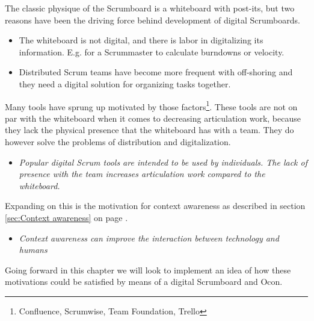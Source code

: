 \documentclass[../report.tex]{subfiles}
\begin{document}
The classic physique of the Scrumboard is a whiteboard with post-its, but two reasons have been the driving force behind development of digital Scrumboards.

\begin{itemize}
\item The whiteboard is not digital, and there is labor in digitalizing its information. E.g. for a Scrummaster to calculate burndowns or velocity.
\item Distributed Scrum teams have become more frequent with off-shoring and they need a digital solution for organizing tasks together.
\end{itemize}

Many tools have sprung up motivated by those factors\footnote{Confluence, Scrumwise, Team Foundation, Trello}. These tools are not on par with the whiteboard when it comes to decreasing articulation work, because they lack the physical presence that the whiteboard has with a team. They do however solve the problems of distribution and digitalization.

\begin{itemize}
\item[\textbf{Motivation 1}] \textit{Popular digital Scrum tools are intended to be used by individuals. The lack of presence with the team increases articulation work compared to the whiteboard.}
\end{itemize}

Expanding on this is the motivation for context awareness as described in section \ref{sec:Context awareness} on page \pageref{sec:Context awareness}.

\begin{itemize}
\item[\textbf{Motivation 2}] \textit{Context awareness can improve the interaction between technology and humans}
\end{itemize}



Going forward in this chapter we will look to implement an idea of how these motivations could be satisfied by means of a digital Scrumboard and Ocon.




\end{document}
